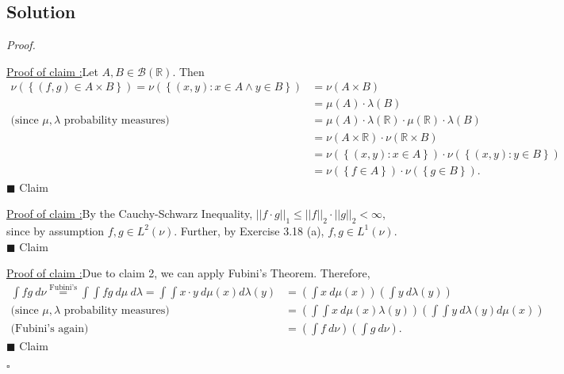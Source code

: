 \documentclass[12pt]{article}
\newcounter{ProofCounter}
\newcounter{ClaimCounter}[ProofCounter]
\newenvironment{Proof}{\stepcounter{ProofCounter}\textit{Proof.}}{\hfill$\square$}
\newenvironment{claim}[1]{\vspace{3mm}\stepcounter{ClaimCounter}\par\noindent\underline{\bf Claim \theClaimCounter:}\space#1}{}
\newenvironment{claimproof}[1]{\par\noindent\underline{Proof of claim \theClaimCounter:}\space#1}{\hfill $\blacksquare$ Claim \theClaimCounter}
\begin{document}
\subsection*{Solution}
\begin{Proof}

\begin{claimproof}
Let $A, B \in \mathcal{B}(\mathbb{R})$. Then 
\begin{align*}
\nu\left( \left\{ (f,g) \in A\times B \right\} \right) = \nu\left(\left\{ (x,y) : x \in A \wedge y \in B \right\}\right) 
& = \nu\left( A\times B \right) \\
& = \mu(A)\cdot\lambda(B) \\
\text{(since $\mu, \lambda$ probability measures) } & = \mu(A)\cdot\lambda(\mathbb{R})\cdot\mu(\mathbb{R})\cdot \lambda(B) \\
& = \nu\left( A\times \mathbb{R} \right)\cdot \nu\left( \mathbb{R} \times B \right) \\
& = \nu\left( \left\{ (x,y) : x \in A \right\} \right)\cdot \nu\left( \left\{ (x,y) : y\in B \right\} \right) \\
& = \nu\left( \left\{ f \in A \right\} \right)\cdot \nu\left( \left\{ g \in B \right\} \right).
\end{align*}
\end{claimproof}

\begin{claimproof}
By the Cauchy-Schwarz Inequality, $||f\cdot g||_{1} \leq ||f||_{2}\cdot ||g||_{2} < \infty$, since by assumption $f,g \in L^{2}(\nu)$. Further, by
Exercise 3.18 (a), $f, g \in L^{1}(\nu)$.
\end{claimproof}

\begin{claimproof}
Due to claim 2, we can apply Fubini's Theorem. Therefore,
\begin{align*}
\int fg\ d\nu \stackrel{\text{Fubini's}}{=} \int \int fg\ d\mu\  d\lambda = \int \int x\cdot y\ d\mu(x)d\lambda(y) & = \left( \int x\ d\mu(x) \right)\left( \int y\ d\lambda(y) \right) \\
\text{(since $\mu, \lambda$ probability measures) } & = \left(\int \int x\ d\mu(x)\lambda(y)\right)\left( \int \int y\ d\lambda(y)d\mu(x) \right) \\
\text{(Fubini's again) } & = \left( \int f\ d\nu \right)\left( \int g\ d\nu \right).
\end{align*}
\end{claimproof}

\end{Proof}
\end{document}
